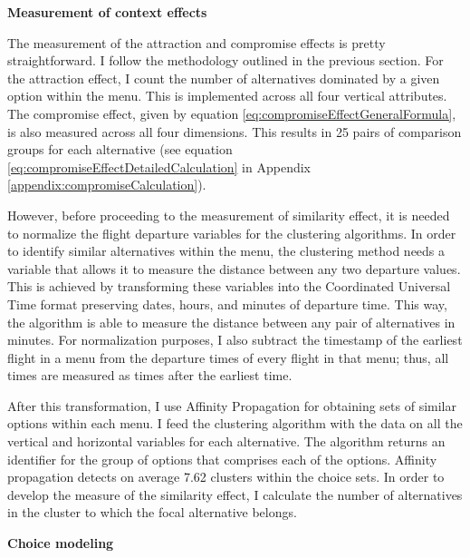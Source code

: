 \documentclass[a4paper,12pt]{article}
\begin{document}
\textbf{Measurement of context effects}

The measurement of the attraction and compromise effects is pretty straightforward. I follow the methodology outlined in the previous section. For the attraction effect, I count the number of alternatives dominated by a given option within the menu. This is implemented across all four vertical attributes. The compromise effect, given by equation \ref{eq:compromiseEffectGeneralFormula}, is also measured across all four dimensions. This results in 25 pairs of comparison groups for each alternative (see equation \ref{eq:compromiseEffectDetailedCalculation} in Appendix \ref{appendix:compromiseCalculation}). 

However, before proceeding to the measurement of similarity effect, it is needed to normalize the flight departure variables for the clustering algorithms. In order to identify similar alternatives within the menu, the clustering method needs a variable that allows it to measure the distance between any two departure values. This is achieved by transforming these variables into the Coordinated Universal Time format preserving dates, hours, and minutes of departure time. This way, the algorithm is able to measure the distance between any pair of alternatives in minutes. For normalization purposes, I also subtract the timestamp of the earliest flight in a menu from the departure times of every flight in that menu; thus, all times are measured as times after the earliest time.

After this transformation, I use Affinity Propagation for obtaining sets of similar options within each menu. I feed the clustering algorithm with the data on all the vertical and horizontal variables for each alternative. The algorithm returns an identifier for the group of options that comprises each of the options. Affinity propagation detects on average 7.62 clusters within the choice sets. In order to develop the measure of the similarity effect, I calculate the number of alternatives in the cluster to which the focal alternative belongs.

\textbf{Choice modeling}
\end{document}
